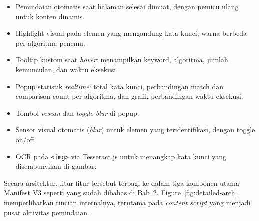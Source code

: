 \documentclass[11pt,a4paper]{article}
\begin{document}
\begin{itemize}
    \item Pemindaian otomatis saat halaman selesai dimuat, dengan pemicu ulang untuk konten dinamis.
    \item Highlight visual pada elemen yang mengandung kata kunci, warna berbeda per algoritma penemu.
    \item Tooltip kustom saat \textit{hover}: menampilkan keyword, algoritma, jumlah kemunculan, dan waktu eksekusi.
    \item Popup statistik \textit{realtime}: total kata kunci, perbandingan match dan comparison count per algoritma, dan grafik
    perbandingan waktu eksekusi.
    \item Tombol \textit{rescan} dan \textit{toggle blur} di popup.
    \item Sensor visual otomatis (\textit{blur}) untuk elemen yang teridentifikasi, dengan toggle on/off.
    \item OCR pada \texttt{<img>} via Tesseract.js untuk menangkap kata kunci yang disembunyikan di gambar.
\end{itemize}

Secara arsitektur, fitur-fitur tersebut terbagi ke dalam tiga komponen utama Manifest V3 seperti yang sudah dibahas di Bab~2.
Figure~\ref{fig:detailed-arch} memperlihatkan rincian internalnya, terutama pada \textit{content script} yang menjadi pusat
aktivitas pemindaian.
\end{document}
